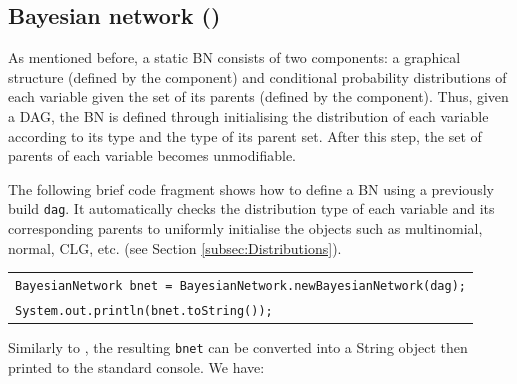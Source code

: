 \subsection{Bayesian network ()}

As mentioned before, a static BN consists of two components: a graphical structure (defined by the  component) and conditional probability distributions of each variable given the set of its parents (defined by the  component). Thus, given a DAG, the BN is defined through initialising the distribution of each variable according to its type and the type of its parent set. After this step, the set of parents of each variable becomes unmodifiable.

The following brief code fragment shows how to define a BN using a previously build \texttt{dag}. It automatically checks the distribution type of each variable and its corresponding parents to uniformly initialise the  objects such as multinomial, normal, CLG, etc. (see Section \ref{subsec:Distributions}).

\vspace{-0.1in}
\begin{table}[H]
\begin{tabular}{l} \hline  
        \texttt{BayesianNetwork bnet = BayesianNetwork.newBayesianNetwork(dag);}\\ 
        \texttt{System.out.println(bnet.toString());}\\ \hline 
\end{tabular}
\end{table}      

Similarly to , the resulting \texttt{bnet} can be converted into a String object then printed to the standard console. We have:


